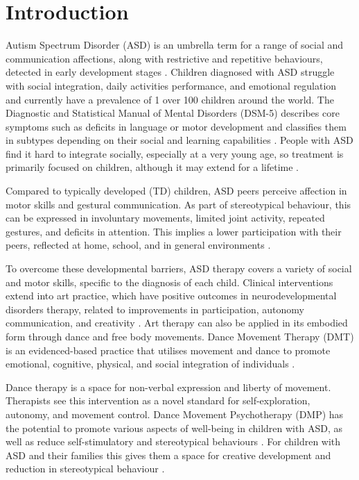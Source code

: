 \documentclass[a4paper,fleqn]{cas-sc}
\begin{document}
\maketitle
\section{Introduction} 
\label{sec1:intro}
Autism Spectrum Disorder (ASD) is an umbrella term for a range of social and communication affections, along with restrictive and repetitive behaviours, detected in early development stages \cite{Lord20}. Children diagnosed with ASD struggle with social integration, daily activities performance, and emotional regulation \cite{Lord18} {and currently have a prevalence of 1 over 100 children} \cite{Zeidan22} around the world. The Diagnostic and Statistical Manual of Mental Disorders (DSM-5) describes core symptoms such as deficits in language or motor development and classifies them in subtypes depending on their social and learning capabilities \cite{DSM-5}. People with ASD find it hard to integrate socially, especially at a very young age, so treatment is primarily focused on children, although it may extend for a lifetime \cite{Lord20}. 

Compared to typically developed (TD) children, ASD peers perceive affection in motor skills and gestural communication. As part of stereotypical behaviour, this can be expressed in involuntary movements, limited joint activity, repeated gestures, and deficits in attention. This implies a lower participation with their peers, reflected at home, school, and in general environments \cite{Oliveira21}.

To overcome these developmental barriers, ASD therapy covers a variety of social and motor skills, specific to the diagnosis of each child. Clinical interventions extend into art practice, which have positive outcomes in neurodevelopmental disorders therapy, related to improvements in participation, autonomy communication, and creativity \cite{Ortuño22}. Art therapy can also be applied in its embodied form through dance and free body movements. Dance Movement Therapy (DMT) is an evidenced-based practice that utilises movement and dance to promote emotional, cognitive, physical, and social integration of individuals \cite{Crooks2021}.

Dance therapy is a space for non-verbal expression and liberty of movement. Therapists see this intervention as a novel standard for self-exploration, autonomy, and movement control.  Dance Movement Psychotherapy (DMP) has the potential to promote various aspects of well-being in children with ASD, as well as reduce self-stimulatory and stereotypical behaviours  \cite{Aithal2021} . For children with ASD and their families this gives them a space for creative development and reduction in stereotypical behaviour \cite{Ziadat22}.
\end{document}
